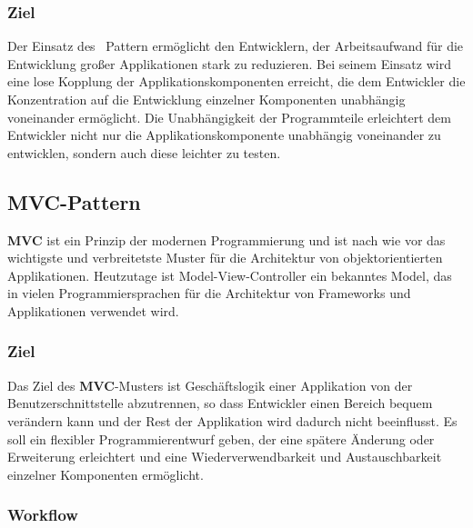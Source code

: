 \subsubsection{Ziel}

Der Einsatz des \di\ Pattern ermöglicht den Entwicklern, der Arbeitsaufwand für die Entwicklung großer Applikationen stark zu reduzieren. Bei seinem Einsatz wird eine lose Kopplung der Applikationskomponenten erreicht, die dem Entwickler die Konzentration auf die Entwicklung einzelner Komponenten unabhängig voneinander ermöglicht. Die Unabhängigkeit der Programmteile erleichtert dem Entwickler nicht nur die Applikationskomponente unabhängig voneinander zu entwicklen, sondern auch diese leichter zu testen. 

\subsection{MVC-Pattern}

\textbf{MVC} ist ein Prinzip der modernen Programmierung und ist nach wie vor das wichtigste und verbreitetste Muster für die Architektur von objektorientierten Applikationen. Heutzutage ist Model-View-Controller ein bekanntes Model, das in vielen Programmiersprachen für die Architektur von Frameworks und Applikationen verwendet wird.

\subsubsection{Ziel}
Das Ziel des \textbf{MVC}-Musters ist Geschäftslogik einer Applikation von der Benutzerschnittstelle abzutrennen, so dass Entwickler einen Bereich bequem verändern kann und der Rest der Applikation wird dadurch nicht beeinflusst.
Es soll ein flexibler Programmierentwurf geben, der eine spätere Änderung oder Erweiterung erleichtert und eine Wiederverwendbarkeit und Austauschbarkeit einzelner Komponenten ermöglicht.

\subsubsection{Workflow}

